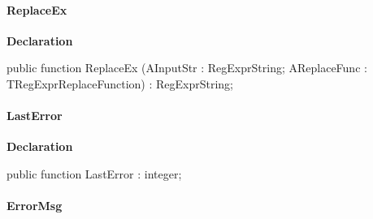 \documentclass{report}
\newif\ifpdf
\begin{document}
\paragraph*{ReplaceEx}\hspace*{\fill}

\label{RegExpr.TRegExpr-ReplaceEx}
\begin{list}{}{
\setlength{\itemindent}{0cm}
\setlength{\listparindent}{0cm}
\setlength{\leftmargin}{\evensidemargin}
\addtolength{\leftmargin}{\tmplength}
\settowidth{\labelsep}{X}
\addtolength{\leftmargin}{\labelsep}
\setlength{\labelwidth}{\tmplength}
}
\item[\textbf{Declaration}\hfill]
\ifpdf
\begin{flushleft}
\fi
\begin{ttfamily}
public function ReplaceEx (AInputStr : RegExprString; AReplaceFunc : TRegExprReplaceFunction) : RegExprString;\end{ttfamily}

\ifpdf
\end{flushleft}
\fi

\end{list}
\paragraph*{LastError}\hspace*{\fill}

\label{RegExpr.TRegExpr-LastError}
\begin{list}{}{
\setlength{\itemindent}{0cm}
\setlength{\listparindent}{0cm}
\setlength{\leftmargin}{\evensidemargin}
\addtolength{\leftmargin}{\tmplength}
\settowidth{\labelsep}{X}
\addtolength{\leftmargin}{\labelsep}
\setlength{\labelwidth}{\tmplength}
}
\item[\textbf{Declaration}\hfill]
\ifpdf
\begin{flushleft}
\fi
\begin{ttfamily}
public function LastError : integer;\end{ttfamily}

\ifpdf
\end{flushleft}
\fi

\end{list}
\paragraph*{ErrorMsg}\hspace*{\fill}
\end{document}
